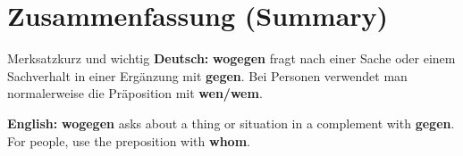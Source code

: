 \documentclass[a4paper,11pt]{article}
\newcommand{\GermanText}[1]{\textbf{Deutsch: }#1\par}
\newcommand{\EnglishText}[1]{{\small\color{SoftGray}\textbf{English: }#1\par}}
\begin{document}
\section{Zusammenfassung (Summary)}
\begin{grammarentry}{Merksatz}{kurz und wichtig}
\GermanText{\textbf{wogegen} fragt nach einer Sache oder einem Sachverhalt in einer Ergänzung mit \textbf{gegen}. Bei Personen verwendet man normalerweise die Präposition mit \textbf{wen/wem}.}
\EnglishText{\textbf{wogegen} asks about a thing or situation in a complement with \textbf{gegen}. For people, use the preposition with \textbf{whom}.}
\end{grammarentry}
\end{document}
